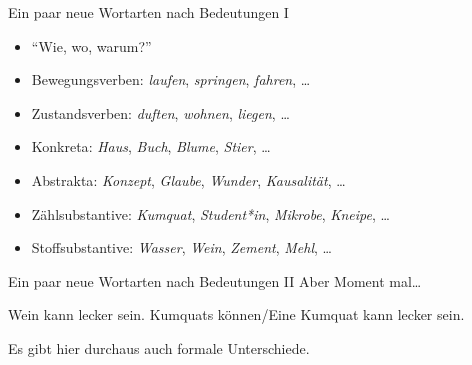 \begin{frame}
  {Ein paar neue Wortarten nach Bedeutungen I}
  \pause
  \begin{itemize}[<+->]
    \item "`Wie, wo, warum?"' 
      \Halbzeile
      \pause
    \item \alert{Bewegungsverben}: \textit{laufen}, \textit{springen}, \textit{fahren}, \dots
    \item \alert{Zustandsverben}: \textit{duften}, \textit{wohnen}, \textit{liegen}, \dots
      \Halbzeile
    \item \alert{Konkreta}: \textit{Haus}, \textit{Buch}, \textit{Blume}, \textit{Stier}, \dots
    \item \alert{Abstrakta}: \textit{Konzept}, \textit{Glaube}, \textit{Wunder}, \textit{Kausalität}, \dots
    \item \alert{Zählsubstantive}: \textit{Kumquat}, \textit{Student*in}, \textit{Mikrobe}, \textit{Kneipe}, \dots
    \item \alert{Stoffsubstantive}: \textit{Wasser}, \textit{Wein}, \textit{Zement}, \textit{Mehl}, \dots
  \end{itemize}
\end{frame}

\begin{frame}
  {Ein paar neue Wortarten nach Bedeutungen II}
  \pause
  Aber Moment mal\dots\\
  \pause
  \Zeile
  \begin{exe}
    \ex
    \begin{xlist}
      \ex \alert{Wein} kann lecker sein.
      \ex \alert{Kumquats können}\slash \alert{Eine Kumquat kann} lecker sein.
    \end{xlist}
  \end{exe}
  \pause
  \Zeile
  Es gibt hier durchaus auch \alert{formale} Unterschiede.
\end{frame}


